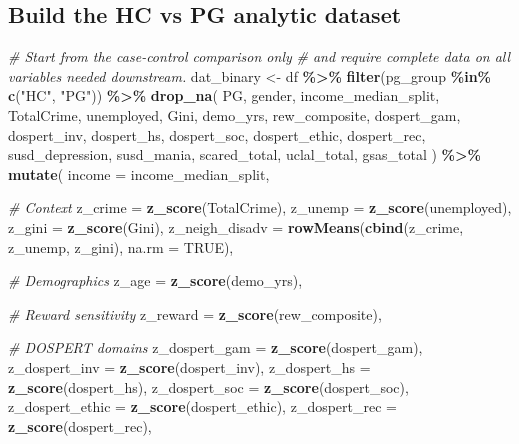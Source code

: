 \documentclass[
]{article}
\newenvironment{Shaded}{\begin{snugshade}}{\end{snugshade}}
\newcommand{\AttributeTok}[1]{\textcolor[rgb]{0.13,0.29,0.53}{#1}}
\newcommand{\CommentTok}[1]{\textcolor[rgb]{0.56,0.35,0.01}{\textit{#1}}}
\newcommand{\ConstantTok}[1]{\textcolor[rgb]{0.56,0.35,0.01}{#1}}
\newcommand{\FunctionTok}[1]{\textcolor[rgb]{0.13,0.29,0.53}{\textbf{#1}}}
\newcommand{\NormalTok}[1]{#1}
\newcommand{\OtherTok}[1]{\textcolor[rgb]{0.56,0.35,0.01}{#1}}
\newcommand{\SpecialCharTok}[1]{\textcolor[rgb]{0.81,0.36,0.00}{\textbf{#1}}}
\newcommand{\StringTok}[1]{\textcolor[rgb]{0.31,0.60,0.02}{#1}}
\begin{document}
\subsection{Build the HC vs PG analytic
dataset}\label{build-the-hc-vs-pg-analytic-dataset}

\begin{Shaded}
\begin{Highlighting}[]
\CommentTok{\# Start from the case{-}control comparison only}
\CommentTok{\# and require complete data on all variables needed downstream.}
\NormalTok{dat\_binary }\OtherTok{\textless{}{-}}\NormalTok{ df }\SpecialCharTok{\%\textgreater{}\%}
  \FunctionTok{filter}\NormalTok{(pg\_group }\SpecialCharTok{\%in\%} \FunctionTok{c}\NormalTok{(}\StringTok{"HC"}\NormalTok{, }\StringTok{"PG"}\NormalTok{)) }\SpecialCharTok{\%\textgreater{}\%}
  \FunctionTok{drop\_na}\NormalTok{(}
\NormalTok{    PG, gender, income\_median\_split,}
\NormalTok{    TotalCrime, unemployed, Gini,}
\NormalTok{    demo\_yrs,}
\NormalTok{    rew\_composite,}
\NormalTok{    dospert\_gam, dospert\_inv, dospert\_hs, dospert\_soc, dospert\_ethic, dospert\_rec,}
\NormalTok{    susd\_depression, susd\_mania, scared\_total, uclal\_total,}
\NormalTok{    gsas\_total}
\NormalTok{  ) }\SpecialCharTok{\%\textgreater{}\%}
  \FunctionTok{mutate}\NormalTok{(}
    \AttributeTok{income =}\NormalTok{ income\_median\_split,}

    \CommentTok{\# Context}
    \AttributeTok{z\_crime =} \FunctionTok{z\_score}\NormalTok{(TotalCrime),}
    \AttributeTok{z\_unemp =} \FunctionTok{z\_score}\NormalTok{(unemployed),}
    \AttributeTok{z\_gini  =} \FunctionTok{z\_score}\NormalTok{(Gini),}
    \AttributeTok{z\_neigh\_disadv =} \FunctionTok{rowMeans}\NormalTok{(}\FunctionTok{cbind}\NormalTok{(z\_crime, z\_unemp, z\_gini), }\AttributeTok{na.rm =} \ConstantTok{TRUE}\NormalTok{),}

    \CommentTok{\# Demographics}
    \AttributeTok{z\_age =} \FunctionTok{z\_score}\NormalTok{(demo\_yrs),}

    \CommentTok{\# Reward sensitivity}
    \AttributeTok{z\_reward =} \FunctionTok{z\_score}\NormalTok{(rew\_composite),}

    \CommentTok{\# DOSPERT domains}
    \AttributeTok{z\_dospert\_gam   =} \FunctionTok{z\_score}\NormalTok{(dospert\_gam),}
    \AttributeTok{z\_dospert\_inv   =} \FunctionTok{z\_score}\NormalTok{(dospert\_inv),}
    \AttributeTok{z\_dospert\_hs    =} \FunctionTok{z\_score}\NormalTok{(dospert\_hs),}
    \AttributeTok{z\_dospert\_soc   =} \FunctionTok{z\_score}\NormalTok{(dospert\_soc),}
    \AttributeTok{z\_dospert\_ethic =} \FunctionTok{z\_score}\NormalTok{(dospert\_ethic),}
    \AttributeTok{z\_dospert\_rec   =} \FunctionTok{z\_score}\NormalTok{(dospert\_rec),}


\end{Highlighting}
\end{Shaded}
\end{document}
